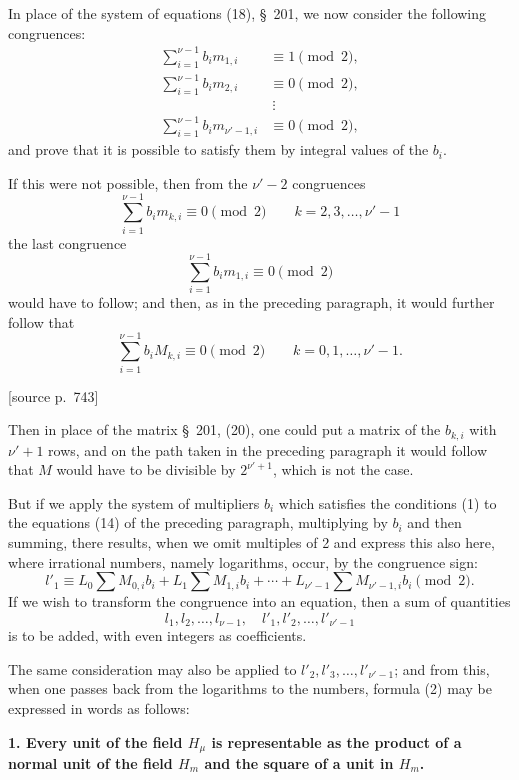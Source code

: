 \documentclass[11pt]{article}
\newcommand{\srcpage}[1]{\par\medskip\noindent\textsf{[source p.~#1]}\par\smallskip}
\begin{document}
In place of the system of equations (18), \S~201, we now consider the following congruences:
\begin{equation}
\begin{aligned}
\sum_{i=1}^{\nu-1}b_i m_{1,i}&\equiv1\pmod2,\\
\sum_{i=1}^{\nu-1}b_i m_{2,i}&\equiv0\pmod2,\\
&\ \vdots\\
\sum_{i=1}^{\nu-1}b_i m_{\nu'-1,i}&\equiv0\pmod2,
\end{aligned}
\tag{1}
\end{equation}
and prove that it is possible to satisfy them by integral values of the $b_i$.

If this were not possible, then from the $\nu'-2$ congruences
\[
\sum_{i=1}^{\nu-1}b_i m_{k,i}\equiv0\pmod2\qquad k=2,3,\ldots,\nu'-1
\]
the last congruence
\[
\sum_{i=1}^{\nu-1}b_i m_{1,i}\equiv0\pmod2
\]
would have to follow; and then, as in the preceding paragraph, it would further follow that
\[
\sum_{i=1}^{\nu-1}b_i M_{k,i}\equiv0\pmod2\qquad k=0,1,\ldots,\nu'-1.
\]

\srcpage{743}
Then in place of the matrix \S~201, (20), one could put a matrix of the $b_{k,i}$ with $\nu'+1$ rows, and on the path taken in the preceding paragraph it would follow that $M$ would have to be divisible by $2^{\nu'+1}$, which is not the case.

But if we apply the system of multipliers $b_i$ which satisfies the conditions (1) to the equations (14) of the preceding paragraph, multiplying by $b_i$ and then summing, there results, when we omit multiples of 2 and express this also here, where irrational numbers, namely logarithms, occur, by the congruence sign:
\begin{equation}
l'_1\equiv L_0\sum M_{0,i}b_i+L_1\sum M_{1,i}b_i+\cdots+L_{\nu'-1}\sum M_{\nu'-1,i}b_i\pmod2.
\tag{2}
\end{equation}
If we wish to transform the congruence into an equation, then a sum of quantities
\[
l_1,l_2,\ldots,l_{\nu-1},\quad l'_1,l'_2,\ldots,l'_{\nu'-1}
\]
is to be added, with even integers as coefficients.

The same consideration may also be applied to $l'_2,l'_3,\ldots,l'_{\nu'-1}$; and from this, when one passes back from the logarithms to the numbers, formula (2) may be expressed in words as follows:

\begin{center}\textbf{1. Every unit of the field $H_\mu$ is representable as the product of a normal unit of the field $H_m$ and the square of a unit in $H_m$.}\end{center}
\end{document}
